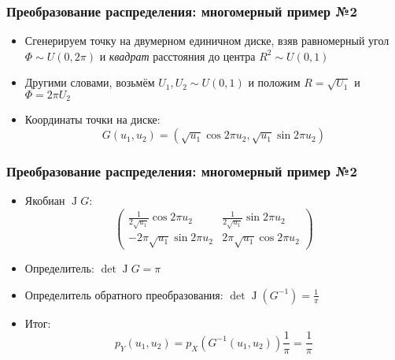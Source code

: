 \documentclass[10pt]{beamer}
\begin{document}
\begin{frame}[fragile]
\frametitle{Преобразование распределения: многомерный пример №2}
\begin{itemize}
\item Сгенерируем точку на двумерном единичном диске, взяв равномерный угол \begin{math}\Phi\sim U(0,2\pi)\end{math} и \textit{квадрат} расстояния до центра \begin{math}R^2\sim U(0,1)\end{math}
\pause
\item Другими словами, возьмём \begin{math}U_1, U_2 \sim U(0,1)\end{math} и положим \begin{math}R = \sqrt{U_1}\end{math} и \begin{math}\Phi = 2\pi U_2\end{math} 
\pause
\item Координаты точки на диске: \begin{equation*}G(u_1, u_2) = (\sqrt{u_1}\cos 2\pi u_2, \sqrt{u_1}\sin 2\pi u_2)\end{equation*}
\end{itemize}
\end{frame}

\begin{frame}[fragile]
\frametitle{Преобразование распределения: многомерный пример №2}
\begin{itemize}
\item Якобиан \begin{math}\operatorname J G\end{math}:
\begin{equation*}
\begin{pmatrix}
\frac{1}{2\sqrt{u_1}}\cos 2\pi u_2 & \frac{1}{2\sqrt{u_1}}\sin 2\pi u_2 \\
-2\pi\sqrt{u_1}\sin 2\pi u_2 & 2\pi\sqrt{u_1}\cos 2\pi u_2
\end{pmatrix}
\end{equation*}
\pause
\item Определитель: \begin{math}\det \operatorname J G = \pi\end{math}
\pause
\item Определитель обратного преобразования: \begin{math}\det \operatorname J(G^{-1}) = \frac{1}{\pi}\end{math}
\pause
\item Итог: \begin{equation*}p_Y(u_1, u_2) = p_X(G^{-1}(u_1, u_2)) \frac{1}{\pi} = \frac{1}{\pi}\end{equation*}
\end{itemize}
\end{frame}
\end{document}
